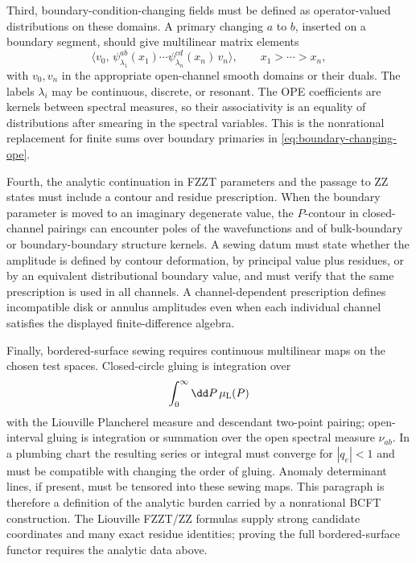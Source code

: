 Third, boundary-condition-changing fields must be defined as
operator-valued distributions on these domains.  A primary changing
\(a\) to \(b\), inserted on a boundary segment, should give multilinear
matrix elements
\[
  \bigl\langle v_0,\,
  \psi^{ab}_{\lambda_1}(x_1)
  \cdots
  \psi^{cd}_{\lambda_n}(x_n)\,
  v_n\bigr\rangle ,
  \qquad x_1>\cdots>x_n ,
\]
with \(v_0,v_n\) in the appropriate open-channel smooth domains or their
duals.  The labels \(\lambda_i\) may be continuous, discrete, or resonant.
The OPE coefficients are kernels between spectral measures, so their
associativity is an equality of distributions after smearing in the spectral
variables.  This is the nonrational replacement for finite sums over
boundary primaries in \eqref{eq:boundary-changing-ope}.

Fourth, the analytic continuation in FZZT parameters and the passage to ZZ
states must include a contour and residue prescription.  When the boundary
parameter is moved to an imaginary degenerate value, the \(P\)-contour in
closed-channel pairings can encounter poles of the wavefunctions and of
bulk-boundary or boundary-boundary structure kernels.  A sewing datum must
state whether the amplitude is defined by contour deformation, by principal
value plus residues, or by an equivalent distributional boundary value, and
must verify that the same prescription is used in all channels.  A
channel-dependent prescription defines incompatible disk or annulus
amplitudes even when each individual channel satisfies the displayed
finite-difference algebra.

Finally, bordered-surface sewing requires continuous multilinear maps on the
chosen test spaces.  Closed-circle gluing is integration over
\[
  \int_0^\infty \dd P\,\mu_{\rm L}(P)
\]
with the Liouville Plancherel measure and descendant two-point pairing;
open-interval gluing is integration or summation over the open spectral
measure \(\nu_{ab}\).  In a plumbing chart the resulting series or integral
must converge for \(|q_e|<1\) and must be compatible with changing the order
of gluing.  Anomaly determinant lines, if present, must be tensored into
these sewing maps.  This paragraph is therefore a definition of the analytic
burden carried by a nonrational BCFT construction.  The Liouville FZZT/ZZ
formulas supply strong candidate coordinates and many exact residue
identities; proving the full bordered-surface functor requires the analytic
data above.

